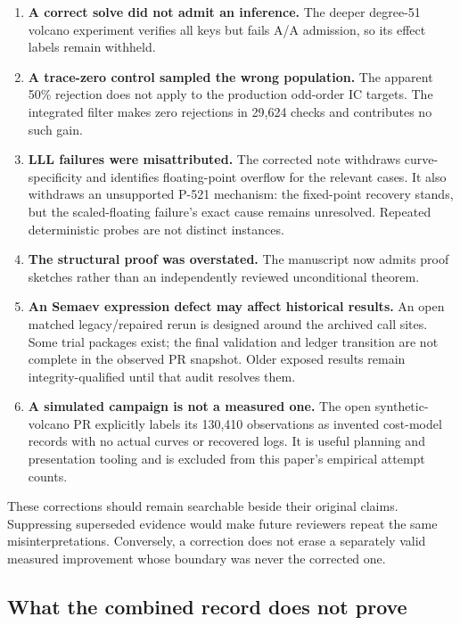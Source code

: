 \begin{enumerate}
\item \textbf{A correct solve did not admit an inference.} The deeper
degree-51 volcano experiment verifies all keys but fails A/A admission,
so its effect labels remain withheld.
\item \textbf{A trace-zero control sampled the wrong population.} The
apparent 50\% rejection does not apply to the production odd-order IC
targets. The integrated filter makes zero rejections in 29,624 checks
and contributes no such gain.
\item \textbf{LLL failures were misattributed.} The corrected note
withdraws curve-specificity and identifies floating-point overflow for
the relevant cases. It also withdraws an unsupported P-521 mechanism:
the fixed-point recovery stands, but the scaled-floating failure's exact
cause remains unresolved. Repeated deterministic probes are not distinct
instances.
\item \textbf{The structural proof was overstated.} The manuscript now
admits proof sketches rather than an independently reviewed unconditional
theorem.
\item \textbf{An Semaev expression defect may affect historical results.}
An open matched legacy/repaired rerun is designed around the archived
call sites. Some trial packages exist; the final validation and ledger
transition are not complete in the observed PR snapshot. Older exposed
results remain integrity-qualified until that audit resolves them.
\item \textbf{A simulated campaign is not a measured one.} The open
synthetic-volcano PR explicitly labels its 130,410 observations as
invented cost-model records with no actual curves or recovered logs.
It is useful planning and presentation tooling and is excluded from
this paper's empirical attempt counts.
\end{enumerate}

These corrections should remain searchable beside their original
claims. Suppressing superseded evidence would make future reviewers
repeat the same misinterpretations. Conversely, a correction does not
erase a separately valid measured improvement whose boundary was never
the corrected one.

\subsection{What the combined record does not prove}

